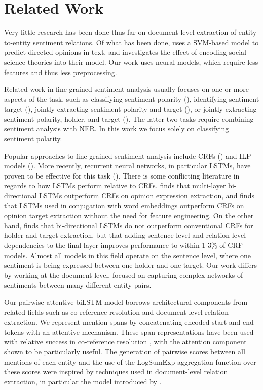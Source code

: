 \documentclass[11pt,a4paper]{article}
\begin{document}
\section{Related Work}
Very little research has been done thus far on document-level extraction of entity-to-entity sentiment relations.
Of what has been done,  uses a SVM-based model to predict directed opinions in text, and investigates the effect of encoding social science theories into their model.
Our work uses neural models, which require less features and thus less preprocessing.
\par Related work in fine-grained sentiment analysis usually
focuses on one or more aspects of the task, such as classifying sentiment polarity (), identifying sentiment target (), jointly extracting sentiment polarity and target (), or jointly extracting sentiment polarity, holder, and target ().
The latter two tasks require combining sentiment analysis with NER.
In this work we focus solely on classifying sentiment polarity.
\par Popular approaches to fine-grained sentiment analysis include CRFs () and ILP models ().
More recently, recurrent neural networks, in particular LSTMs, have proven to be effective for this task ().
There is some conflicting literature in regards to how LSTMs perform relative to CRFs.
 finds that multi-layer bi-directional LSTMs outperform CRFs on opinion expression extraction, and  finds that LSTMs used in conjugation with word embeddings outperform CRFs on opinion target extraction without the need for feature engineering.
On the other hand,  finds that bi-directional LSTMs do not outperform conventional CRFs for holder and target extraction, but that adding sentence-level and relation-level dependencies to the final layer improves performance to within 1-3\% of CRF models.
Almost all models in this field operate on the sentence level, where one sentiment is being expressed between one holder and one target.
Our work differs by working at the document level, focused on capturing complex networks of sentiments between many different entity pairs.
\par Our pairwise attentive biLSTM model borrows architectural components from related fields such as co-reference resolution and document-level relation extraction.
We represent mention spans by concatenating encoded start and end tokens with an attentive mechanism.
These span representations have been used with relative success in co-reference resolution \cite{Lee:17}, with the attention component shown to be particularly useful.
The generation of pairwise scores between all mentions of each entity and the use of the LogSumExp aggregation function over these scores were inspired by techniques used in document-level relation extraction, in particular the model introduced by .
\end{document}
